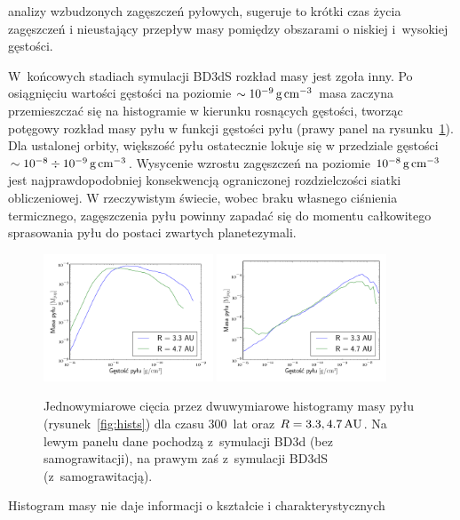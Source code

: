 analizy wzbudzonych zagęszczeń pyłowych, sugeruje to krótki czas życia
zagęszczeń i nieustający przepływ masy pomiędzy obszarami o niskiej i~wysokiej
gęstości. 
\par W~końcowych stadiach symulacji BD3dS rozkład masy jest zgoła
inny. Po osiągnięciu wartości gęstości na poziomie $\sim10^{-9}\hbox{$\thinspace\textrm{g}$}\hbox{$\thinspace\textrm{cm}$}^{-3}$ masa
zaczyna przemieszczać się na histogramie w kierunku rosnących gęstości, tworząc
potęgowy rozkład masy pyłu w funkcji gęstości pyłu (prawy panel na
rysunku~\ref{fig:hists1d}). Dla ustalonej orbity, większość pyłu ostatecznie
lokuje się w przedziale gęstości $\sim10^{-8}\div10^{-9}\hbox{$\thinspace\textrm{g}$}\hbox{$\thinspace\textrm{cm}$}^{-3}$.  Wysycenie
wzrostu zagęszczeń na poziomie $10^{-8}\hbox{$\thinspace\textrm{g}$}\hbox{$\thinspace\textrm{cm}$}^{-3}$ jest najprawdopodobniej
konsekwencją ograniczonej rozdzielczości siatki obliczeniowej. W rzeczywistym
świecie, wobec braku własnego ciśnienia termicznego, zagęszczenia pyłu powinny
zapadać się do momentu całkowitego sprasowania pyłu do postaci zwartych
planetezymali.
%
\begin{figure} 
  \centering
  \includegraphics[width=0.45\textwidth]{figures/hist1d_nosg}
  \includegraphics[width=0.45\textwidth]{figures/hist1d_sg}
  \caption[Histogramy masy pyłu dla wybranych orbit w symulacjach BD3d i BD3dS.]
  {Jednowymiarowe cięcia przez dwuwymiarowe histogramy masy pyłu
  (rysunek~\ref{fig:hists}) dla czasu 300~lat oraz $R = 3.3, 4.7\hbox{$\thinspace\textrm{AU}$}$. Na lewym
  panelu dane pochodzą z~symulacji BD3d (bez samograwitacji), na prawym zaś
  z~symulacji BD3dS (z~samograwitacją).}
  \label{fig:hists1d} 
\end{figure}
%
\par Histogram masy nie daje informacji o kształcie i charakterystycznych
